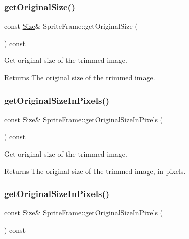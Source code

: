 \subsubsection{\texorpdfstring{get\+Original\+Size()}{getOriginalSize()}\hspace{0.1cm}{\footnotesize\ttfamily [2/2]}}
{\footnotesize\ttfamily const \hyperlink{classSize}{Size}\& Sprite\+Frame\+::get\+Original\+Size (\begin{DoxyParamCaption}{ }\end{DoxyParamCaption}) const\hspace{0.3cm}{\ttfamily [inline]}}

Get original size of the trimmed image.

\begin{DoxyReturn}{Returns}
The original size of the trimmed image. 
\end{DoxyReturn}
\mbox{\label{classSpriteFrame_ad1dd3ee536ab1374f915713fe9520673}} 
\subsubsection{\texorpdfstring{get\+Original\+Size\+In\+Pixels()}{getOriginalSizeInPixels()}\hspace{0.1cm}{\footnotesize\ttfamily [1/2]}}
{\footnotesize\ttfamily const \hyperlink{classSize}{Size}\& Sprite\+Frame\+::get\+Original\+Size\+In\+Pixels (\begin{DoxyParamCaption}{ }\end{DoxyParamCaption}) const\hspace{0.3cm}{\ttfamily [inline]}}

Get original size of the trimmed image.

\begin{DoxyReturn}{Returns}
The original size of the trimmed image, in pixels. 
\end{DoxyReturn}
\mbox{\label{classSpriteFrame_ad1dd3ee536ab1374f915713fe9520673}} 
\subsubsection{\texorpdfstring{get\+Original\+Size\+In\+Pixels()}{getOriginalSizeInPixels()}\hspace{0.1cm}{\footnotesize\ttfamily [2/2]}}
{\footnotesize\ttfamily const \hyperlink{classSize}{Size}\& Sprite\+Frame\+::get\+Original\+Size\+In\+Pixels (\begin{DoxyParamCaption}{ }\end{DoxyParamCaption}) const\hspace{0.3cm}{\ttfamily [inline]}}

